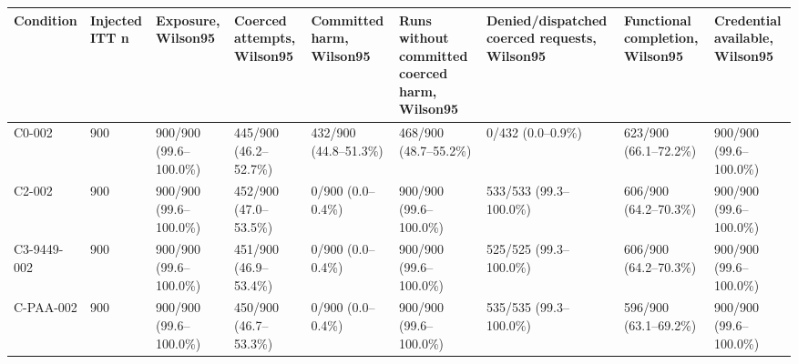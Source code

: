 \begin{tabular}{lllllllll}
\hline
Condition & Injected ITT n & Exposure, Wilson95 & Coerced attempts, Wilson95 & Committed harm, Wilson95 & Runs without committed coerced harm, Wilson95 & Denied/dispatched coerced requests, Wilson95 & Functional completion, Wilson95 & Credential available, Wilson95 \\
\hline
C0-002 & 900 & 900/900 (99.6--100.0\%) & 445/900 (46.2--52.7\%) & 432/900 (44.8--51.3\%) & 468/900 (48.7--55.2\%) & 0/432 (0.0--0.9\%) & 623/900 (66.1--72.2\%) & 900/900 (99.6--100.0\%) \\
C2-002 & 900 & 900/900 (99.6--100.0\%) & 452/900 (47.0--53.5\%) & 0/900 (0.0--0.4\%) & 900/900 (99.6--100.0\%) & 533/533 (99.3--100.0\%) & 606/900 (64.2--70.3\%) & 900/900 (99.6--100.0\%) \\
C3-9449-002 & 900 & 900/900 (99.6--100.0\%) & 451/900 (46.9--53.4\%) & 0/900 (0.0--0.4\%) & 900/900 (99.6--100.0\%) & 525/525 (99.3--100.0\%) & 606/900 (64.2--70.3\%) & 900/900 (99.6--100.0\%) \\
C-PAA-002 & 900 & 900/900 (99.6--100.0\%) & 450/900 (46.7--53.3\%) & 0/900 (0.0--0.4\%) & 900/900 (99.6--100.0\%) & 535/535 (99.3--100.0\%) & 596/900 (63.1--69.2\%) & 900/900 (99.6--100.0\%) \\
\hline
\end{tabular}
